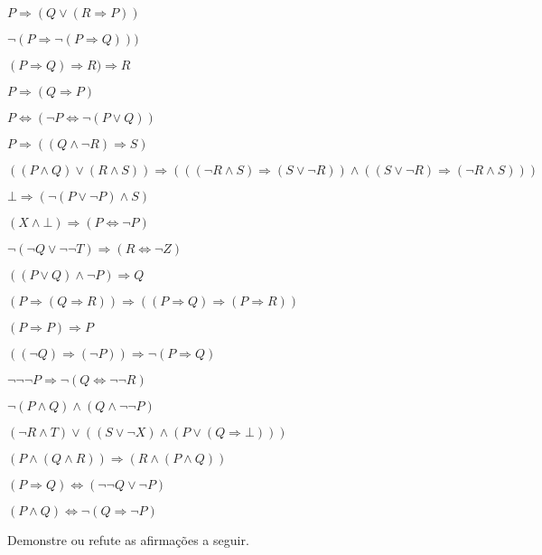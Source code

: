 \begin{exerList}
  \item $P \Rightarrow (Q \lor (R \Rightarrow P))$
  \item $\neg (P \Rightarrow \neg (P \Rightarrow Q)))$
  \item $(P \Rightarrow Q) \Rightarrow R) \Rightarrow R$
  \item $P \Rightarrow (Q \Rightarrow P)$
  \item $P \Leftrightarrow (\neg P \Leftrightarrow \neg (P \lor Q))$
  \item $P \Rightarrow ((Q \land \neg R) \Rightarrow S)$
  \item $((P \land Q) \lor (R \land S)) \Rightarrow (((\neg R \land S) \Rightarrow (S \lor \neg R)) \land ((S \lor \neg R) \Rightarrow (\neg R \land S) ))$
  \item $\bot \Rightarrow (\neg (P \lor \neg P) \land S)$
  \item $(X \land \bot) \Rightarrow (P \Leftrightarrow \neg P)$
  \item $\neg(\neg Q \lor \neg \neg T) \Rightarrow (R \Leftrightarrow \neg Z)$
  \item $((P \lor Q) \land \neg P) \Rightarrow Q$
  \item $(P \Rightarrow (Q \Rightarrow R)) \Rightarrow ((P \Rightarrow Q) \Rightarrow (P \Rightarrow R))$
  \item $(P \Rightarrow P) \Rightarrow P$
  \item $((\neg Q) \Rightarrow (\neg P)) \Rightarrow \neg (P \Rightarrow Q)$
  \item $\neg \neg \neg P \Rightarrow \neg (Q \Leftrightarrow \neg \neg R)$
  \item $\neg (P \land Q) \land (Q \land \neg \neg P)$
  \item $(\neg R \land T) \lor ((S \lor \neg X)\land(P \lor (Q \Rightarrow \bot)))$
  \item $(P \land (Q \land R)) \Rightarrow (R \land (P \land Q))$
  \item $(P \Rightarrow Q) \Leftrightarrow (\neg \neg Q \lor \neg P)$
  \item $(P \land Q) \Leftrightarrow \neg (Q \Rightarrow \neg P)$
\end{exerList}


\begin{questao}\label{test:LPro7}
  Demonstre ou refute as afirmações a seguir.
\end{questao}

